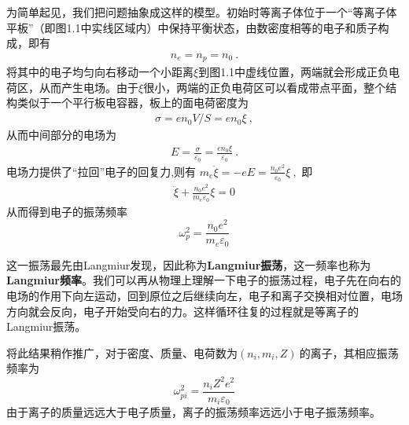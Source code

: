 为简单起见，我们把问题抽象成这样的模型。初始时等离子体位于一个“等离子体平板”（即图1.1中实线区域内）中保持平衡状态，由数密度相等的电子和质子构成，即有
			\begin{align}
				n_e=n_p=n_0~.
			\end{align}
			将其中的电子均匀向右移动一个小距离$\xi$到图1.1中虚线位置，两端就会形成正负电荷区，从而产生电场。由于$\xi$很小，两端的正负电荷区可以看成带点平面，整个结构类似于一个平行板电容器，板上的面电荷密度为
			\begin{align}
			\sigma=en_0V/S=en_0\xi~,
			\end{align}
			从而中间部分的电场为
			\begin{align}
			E=\frac{\sigma}{\varepsilon_0}=\frac{en_0\xi}{\varepsilon_0}~.
			\end{align}
			电场力提供了“拉回”电子的回复力,则有
			$m_e\ddot{\xi}=-eE=\frac{n_0e^2}{\varepsilon_0}\xi~,$
			即
			\begin{align}
			\ddot{\xi}+\frac{n_0e^2}{m_e\varepsilon_0}\xi=0
			\end{align}
			从而得到电子的振荡频率
			\begin{equation}\label{key}
			\boxed{\omega_p^2=\frac{n_0e^2}{m_e\varepsilon_0}}
			\end{equation}
			
			这一振荡最先由Langmiur发现，因此称为\textbf{Langmiur振荡}，这一频率也称为\textbf{Langmiur频率}。我们可以再从物理上理解一下电子的振荡过程，电子先在向右的电场的作用下向左运动，回到原位之后继续向左，电子和离子交换相对位置，电场方向就会反向，电子开始受向右的力。这样循环往复的过程就是等离子的Langmiur振荡。
			
			将此结果稍作推广，对于密度、质量、电荷数为$(n_i,m_i,Z)~$的离子，其相应振荡频率为
			\begin{equation}\label{key}
			\omega_{pi}^2=\frac{n_i Z^2e^2}{m_i\varepsilon_0}
			\end{equation}
			由于离子的质量远远大于电子质量，离子的振荡频率远远小于电子振荡频率。



